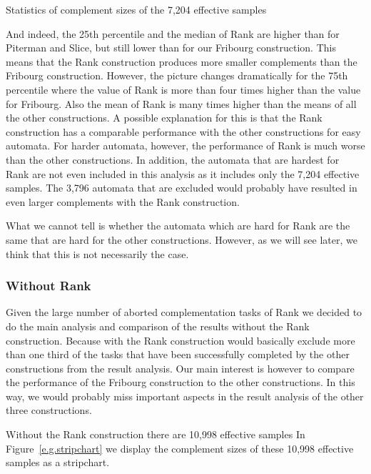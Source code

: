 \begin{table}[ht]
\centering

\caption{Statistics of complement sizes of the 7,204 effective samples}
\label{e.g.stats.with_rank}
\end{table}

And indeed, the 25th percentile and the median of Rank are higher than for Piterman and Slice, but still lower than for our Fribourg construction. This means that the Rank construction produces more smaller complements than the Fribourg construction. However, the picture changes dramatically for the 75th percentile where the value of Rank is more than four times higher than the value for Fribourg. Also the mean of Rank is many times higher than the means of all the other constructions. A possible explanation for this is that the Rank construction has a comparable performance with the other constructions for easy automata. For harder automata, however, the performance of Rank is much worse than the other constructions. In addition, the automata that are hardest for Rank are not even included in this analysis as it includes only the 7,204 effective samples. The 3,796 automata that are excluded would probably have resulted in even larger complements with the Rank construction.

What we cannot tell is whether the automata which are hard for Rank are the same that are hard for the other constructions. However, as we will see later, we think that this is not necessarily the case.

\subsubsection{Without Rank}

Given the large number of aborted complementation tasks of Rank we decided to do the main analysis and comparison of the results without the Rank construction. Because with the Rank construction would basically exclude more than one third of the tasks that have been successfully completed by the other constructions from the result analysis. Our main interest is however to compare the performance of the Fribourg construction to the other constructions. In this way, we would probably miss important aspects in the result analysis of the other three constructions. 

Without the Rank construction there are 10,998 effective samples In Figure~\ref{e.g.stripchart} we display the complement sizes of these 10,998 effective samples as a stripchart.


